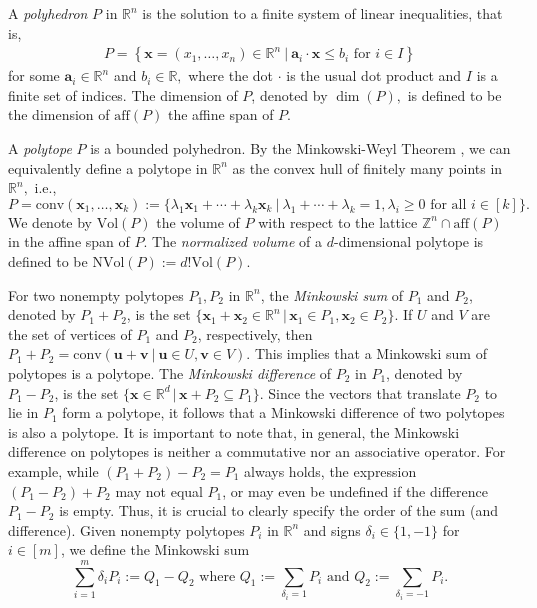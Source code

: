 \documentclass[12pt,reqno]{article}%
\theoremstyle{definition}
\numberwithin{equation}{section}
\newcommand{\vol}{\mathrm{Vol}}
\newcommand{\nvol}{\mathrm{NVol}}
\newcommand{\bba}{\mathbf{a}}
\newcommand{\bbu}{\mathbf{u}}
\newcommand{\bbv}{\mathbf{v}}
\newcommand{\bbx}{\mathbf{x}}
\newcommand{\conv}{\mathrm{conv}}
\newcommand{\Z}{\mathbb Z}
\newcommand{\R}{\mathbb R}
\begin{document}
A \emph{polyhedron} $P$ in $\R^n$ is the solution to a finite system of linear inequalities, that is, 
\begin{align}\label{eq:polyhedra-inq}
    P = \left\{\bbx=(x_1, \dots, x_n) \in \R^n\ \Big\vert \  \bba_i \cdot \bbx \leq b_i \text{ for } i \in I\right\}
\end{align}
for some $\bba_i \in \R^n$ and $b_i \in \R,$ where the dot $\cdot$ is the usual dot product and $I$ is a finite set of indices. The dimension of $P$, denoted by $\dim(P),$ is defined to be the dimension of $\mathrm{aff}(P)$ the affine span of $P$.

A \emph{polytope} $P$ is a bounded polyhedron. By the Minkowski-Weyl Theorem \cite{Minkowski1968, Weyl1934}, we can equivalently define a polytope in $\R^n$ as the convex hull of finitely many points in $\R^n,$ i.e.,
\[P = \conv(\bbx_1, \dots, \bbx_k) := \{\lambda_1\bbx_1 +\cdots + \lambda_k\bbx_k\ | \ \lambda_1 + \cdots + \lambda_k = 1, \lambda_i \geq 0 \text{ for all } i \in [k]\}.\]
We denote by $\vol(P)$ the volume of $P$ with respect to the lattice $\Z^n \cap \mathrm{aff}(P)$ in the affine span of $P.$ The \emph{normalized volume} of a $d$-dimensional polytope is defined to be $\nvol(P):= d!\vol(P).$

For two nonempty polytopes $P_1, P_2$ in $\R^n$, the \emph{Minkowski sum} of $P_1$ and $P_2$, denoted by $P_1 + P_2$,  is the set $\{\bbx_1 + \bbx_2 \in \R^n \,|\, \bbx_1 \in P_1, \bbx_2 \in P_2\}$. If $U$ and $V$ are the set of vertices of $P_1$ and $P_2$, respectively, then $P_1+ P_2 = \conv(\bbu + \bbv \ | \ \bbu \in U, \bbv \in V)$. This implies that a Minkowski sum of polytopes is a polytope. The \emph{Minkowski difference} of $P_2$ in $P_1$, denoted by $P_1 - P_2$, is the set $\{\bbx \in \R^d \,|\, \bbx + P_2 \subseteq P_1\}$. Since the vectors that translate $P_2$ to lie in $P_1$ form a polytope, it follows that a Minkowski difference of two polytopes is also a polytope. It is important to note that, in general, the Minkowski difference on polytopes is neither a commutative nor an associative operator. For example, while $(P_1 + P_2) - P_2 = P_1$ always holds, the expression $(P_1 - P_2) + P_2$ may not equal $P_1$, or may even be undefined if the difference $P_1 - P_2$ is empty. Thus, it is crucial to clearly specify the order of the sum (and difference). Given nonempty polytopes $P_i$ in $\R^n$ and signs $\delta_i \in \{1, -1\}$ for $i \in [m]$, we define the Minkowski sum
\[\sum^{m}_{i = 1}\delta_i P_i := Q_1 - Q_2 \text{ where } Q_1 := \sum_{\delta_i = 1} P_i \text{ and } Q_2 := \sum_{\delta_i = -1} P_i.\]
\end{document}
